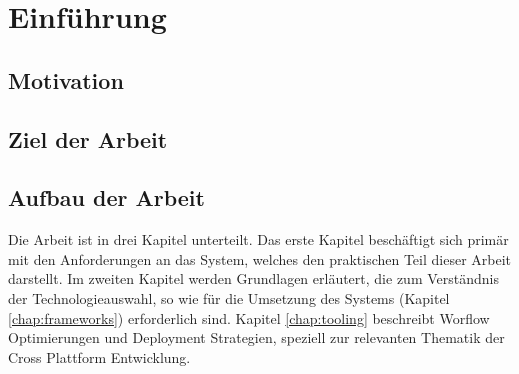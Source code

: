
\chapter{Einführung}
\label{chap:introduction}


\section{Motivation}

\section{Ziel der Arbeit}

\section{Aufbau der Arbeit}
Die Arbeit ist in drei Kapitel unterteilt. Das erste Kapitel beschäftigt sich primär mit den
Anforderungen an das System, welches den praktischen Teil dieser Arbeit darstellt.
Im zweiten Kapitel werden Grundlagen erläutert, die zum Verständnis der Technologieauswahl,
so wie für die Umsetzung des Systems (Kapitel \ref{chap:frameworks}) erforderlich sind. Kapitel \ref{chap:tooling}
beschreibt Worflow Optimierungen und Deployment Strategien, speziell zur relevanten
Thematik der Cross Plattform Entwicklung.
